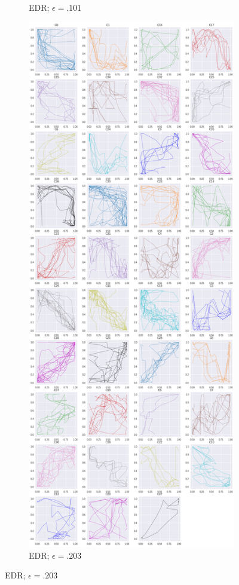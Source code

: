 \begin{figure}[h]
\begin{subfigure}[c]{0.35\linewidth}
    \caption{EDR; $\epsilon=.101$}
  \end{subfigure}
  \hspace{.5em}
    \begin{subfigure}[c]{0.35\linewidth}
      \includegraphics[width=\linewidth]{figs/clusters/CLU_AP_ALL[EDR;e=.203].png}
    \caption{EDR; $\epsilon=.203$}
  \end{subfigure}
  \hspace{.5em}
  

\end{figure}
